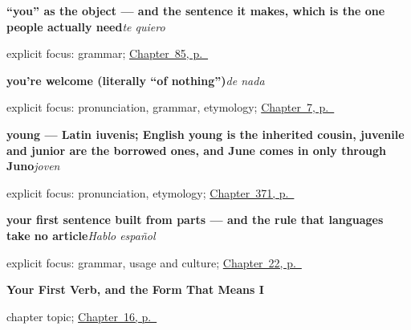 \noindent\begin{minipage}[t]{\linewidth}
\raggedright
\textbf{\textquotedblleft{}you\textquotedblright{} as the object — and the sentence it makes, which is the one people actually need}\enspace\emph{te quiero}\par
\footnotesize explicit focus: grammar; \hyperref[ch:pronoun-me-te]{Chapter~85, p.~\pageref*{ch:pronoun-me-te}}
\end{minipage}\par\smallskip

\noindent\begin{minipage}[t]{\linewidth}
\raggedright
\textbf{you're welcome (literally \textquotedblleft{}of nothing\textquotedblright{})}\enspace\emph{de nada}\par
\footnotesize explicit focus: pronunciation, grammar, etymology; \hyperref[ch:thank-you]{Chapter~7, p.~\pageref*{ch:thank-you}}
\end{minipage}\par\smallskip

\noindent\begin{minipage}[t]{\linewidth}
\raggedright
\textbf{young — Latin iuvenis; English young is the inherited cousin, juvenile and junior are the borrowed ones, and June comes in only through Juno}\enspace\emph{joven}\par
\footnotesize explicit focus: pronunciation, etymology; \hyperref[ch:pequeno-y-gordo]{Chapter~371, p.~\pageref*{ch:pequeno-y-gordo}}
\end{minipage}\par\smallskip

\noindent\begin{minipage}[t]{\linewidth}
\raggedright
\textbf{your first sentence built from parts — and the rule that languages take no article}\enspace\emph{Hablo español}\par
\footnotesize explicit focus: grammar, usage and culture; \hyperref[ch:spanish-espanol]{Chapter~22, p.~\pageref*{ch:spanish-espanol}}
\end{minipage}\par\smallskip

\noindent\begin{minipage}[t]{\linewidth}
\raggedright
\textbf{Your First Verb, and the Form That Means I}\par
\footnotesize chapter topic; \hyperref[ch:first-verb]{Chapter~16, p.~\pageref*{ch:first-verb}}
\end{minipage}\par\smallskip

